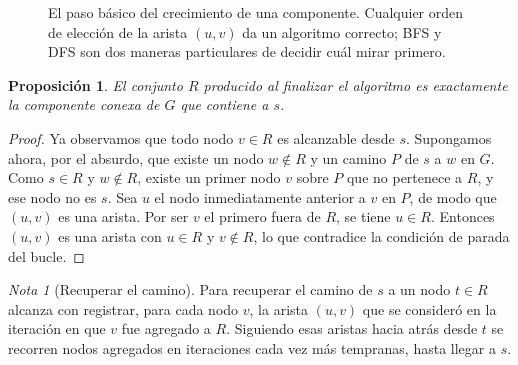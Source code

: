 \documentclass[12pt, spanish, oneside, openany]{book}
\theoremstyle{uprightplain}
\newtheorem{proposicion}[teorema]{Proposición}
\theoremstyle{definition}
\theoremstyle{remark}
\newtheorem{nota}[teorema]{Nota}
\theoremstyle{definition}
\begin{document}
\begin{figure}[H]
\centering
{}
\caption{El paso básico del crecimiento de una componente. Cualquier orden de
elección de la arista $(u,v)$ da un algoritmo correcto; BFS y DFS son dos
maneras particulares de decidir cuál mirar primero.}
\label{fig:crecer-componente}
\end{figure}

\begin{proposicion}
\label{prop:componente}
El conjunto $R$ producido al finalizar el algoritmo es exactamente la componente conexa de $G$ que contiene a $s$.
\end{proposicion}
\begin{proof}
Ya observamos que todo nodo $v\in R$ es alcanzable desde $s$. Supongamos ahora, por el absurdo, que existe un nodo $w\notin R$ y un camino $P$ de $s$ a $w$ en $G$. Como $s\in R$ y $w\notin R$, existe un primer nodo $v$ sobre $P$ que no pertenece a $R$, y ese nodo no es $s$. Sea $u$ el nodo inmediatamente anterior a $v$ en $P$, de modo que $(u,v)$ es una arista. Por ser $v$ el primero fuera de $R$, se tiene $u\in R$. Entonces $(u,v)$ es una arista con $u\in R$ y $v\notin R$, lo que contradice la condición de parada del bucle.
\end{proof}

\begin{nota}[Recuperar el camino]
Para recuperar el camino de $s$ a un nodo $t\in R$ alcanza con registrar, para cada nodo $v$, la arista $(u,v)$ que se consideró en la iteración en que $v$ fue agregado a $R$. Siguiendo esas aristas hacia atrás desde $t$ se recorren nodos agregados en iteraciones cada vez más tempranas, hasta llegar a $s$.
\end{nota}
\end{document}
